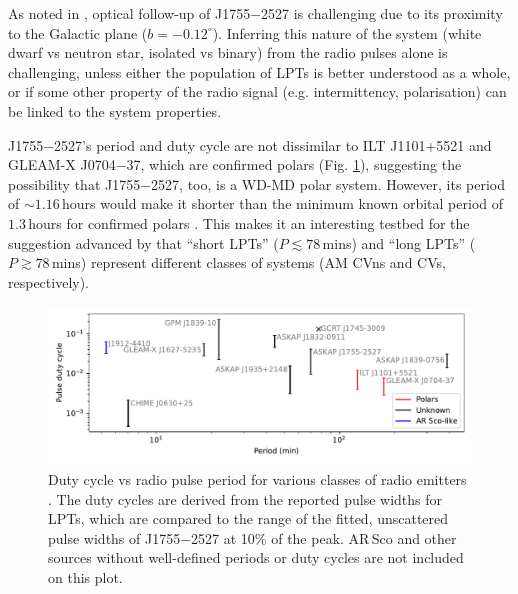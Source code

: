 \documentclass[fleqn,usenatbib]{mnras}
\newcommand{\src}{J1755$-$2527}
\begin{document}
As noted in , optical follow-up of \src{} is challenging due to its proximity to the Galactic plane ($b = -0.12^\circ$).
Inferring this nature of the system (white dwarf vs neutron star, isolated vs binary) from the radio pulses alone is challenging, unless either the population of LPTs is better understood as a whole, or if some other property of the radio signal (e.g. intermittency, polarisation) can be linked to the system properties.

\src{}'s period and duty cycle are not dissimilar to ILT J1101+5521 and GLEAM-X J0704$-$37, which are confirmed polars (Fig. \ref{fig:lpt_comparison}), suggesting the possibility that \src{}, too, is a WD-MD polar system.
However, its period of ${\sim}1.16\,$hours would make it shorter than the minimum known orbital period of $1.3\,$hours for confirmed polars \citep{schwope2025polarcatcatalogpolarslowaccretion}.
This makes it an interesting testbed for the suggestion advanced by \citet{2025arXiv250103315R} that ``short LPTs'' ($P \lesssim 78\,$mins) and ``long LPTs'' ($P \gtrsim 78\,$mins) represent different classes of systems (AM CVns and CVs, respectively).
\begin{figure}[th]
    \centering
    \includegraphics[width=0.98\linewidth]{lpt_comparison.pdf}
    \caption{Duty cycle vs radio pulse period for various classes of radio emitters \citep{2024arXiv240707480D,2022Natur.601..526H,2023Natur.619..487H,2024NatAs...8.1159C,2005Natur.434...50H,2024arXiv240811536D,Lee2025}. The duty cycles are derived from the reported pulse widths for LPTs, which are compared to the range of the fitted, unscattered pulse widths of \src{} at 10\% of the peak. AR\,Sco \citep{2016Natur.537..374M,2018A&A...611A..66S} and other sources without well-defined periods or duty cycles \citep[e.g.][and references therein]{2021ApJ...920...45W} are not included on this plot.}
    \label{fig:lpt_comparison}
\end{figure}
\end{document}
